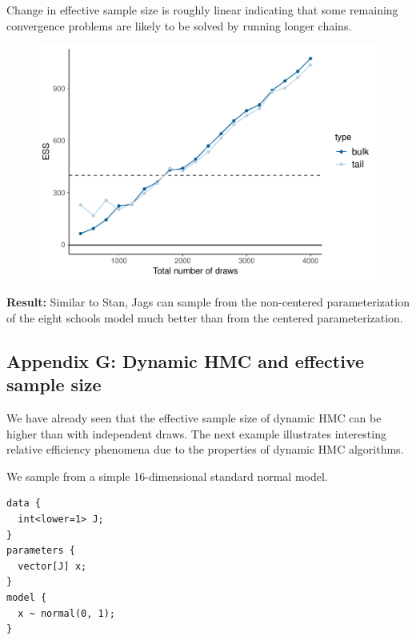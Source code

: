 \documentclass[american,]{article}
\begin{document}
Change in effective sample size is roughly linear indicating that some
remaining convergence problems are likely to be solved by running longer
chains.

\begin{figure}[t]
  \centering
  \includegraphics[width=0.6\linewidth]{graphics/change-ess-jags-ncp-tau-1.pdf}
\end{figure}

\textbf{Result:} Similar to Stan, Jags can sample from the non-centered
parameterization of the eight schools model much better than from the
centered parameterization.

\hypertarget{AppendixG}{%
\subsection*{Appendix G: Dynamic HMC and effective sample
size}\label{AppendixG}}

We have already seen that the effective sample size of dynamic HMC can
be higher than with independent draws. The next example illustrates
interesting relative efficiency phenomena due to the properties of
dynamic HMC algorithms.

We sample from a simple 16-dimensional standard normal model.

\begin{verbatim}
data {
  int<lower=1> J;
}
parameters {
  vector[J] x;
}
model {
  x ~ normal(0, 1);
}
\end{verbatim}
\end{document}
